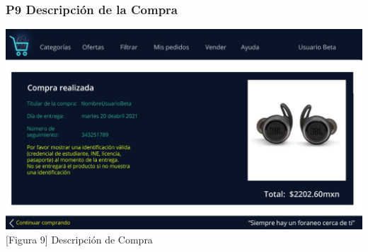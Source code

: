 \documentclass[14pt]{article}
\begin{document}
            \subsubsection{P9 Descripción de la Compra}\label{P9 Descripción de la Compra}
                \begin{center}
                    \includegraphics[height=0.55\textwidth]{DescripcionDeCompra.jpg}
                    \label{fig:DescripcionDeCompra}
                    \vspace{0.5cm}[Figura 9] Descripción de Compra
                \end{center}
            
\end{document}
